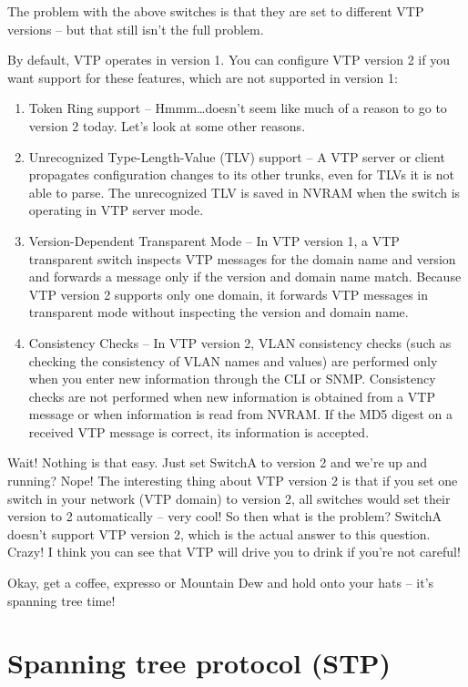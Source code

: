 The problem with the above switches is that they are set to different
VTP versions -- but that still isn't the full problem.

By default, VTP
operates in version 1. You can configure VTP version 2 if you want
support for these features, which are not supported in version 1:

\begin{enumerate}
\tightlist
\item
  Token Ring support -- Hmmm\ldots doesn't seem like much of a reason to
  go to version 2 today. Let's look at some other reasons.
\item
  Unrecognized Type-Length-Value (TLV) support -- A VTP server or client
  propagates configuration changes to its other trunks, even for TLVs it
  is not able to parse. The unrecognized TLV is saved in NVRAM when the
  switch is operating in VTP server mode.
\item
  Version-Dependent Transparent Mode -- In VTP version 1, a VTP
  transparent switch inspects VTP messages for the domain name and
  version and forwards a message only if the version and domain name
  match. Because VTP version 2 supports only one domain, it forwards VTP
  messages in transparent mode without inspecting the version and domain
  name.
\item
  Consistency Checks -- In VTP version 2, VLAN consistency checks (such
  as checking the consistency of VLAN names and values) are performed
  only when you enter new information through the CLI or SNMP.
  Consistency checks are not performed when new information is obtained
  from a VTP message or when information is read from NVRAM. If the MD5
  digest on a received VTP message is correct, its information is
  accepted.
\end{enumerate}

Wait! Nothing is that easy. Just set SwitchA to version 2 and we're up
and running? Nope! The interesting thing about VTP version 2 is that if
you set one switch in your network (VTP domain) to version 2, all
switches would set their version to 2 automatically -- very cool! So then
what is the problem? SwitchA doesn't support VTP version 2, which is the
actual answer to this question. Crazy! I think you can see that VTP will
drive you to drink if you're not careful!

Okay, get a coffee, expresso or Mountain Dew and hold onto your
hats -- it's spanning tree time!

\section{Spanning tree protocol (STP)}

